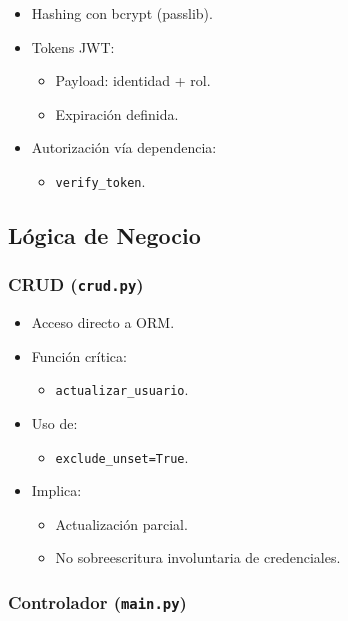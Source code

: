 \documentclass[12pt,letterpaper]{article}
\begin{document}
\begin{itemize}
    \item Hashing con bcrypt (passlib).
    \item Tokens JWT:
    \begin{itemize}
        \item Payload: identidad + rol.
        \item Expiración definida.
    \end{itemize}
    \item Autorización vía dependencia:
    \begin{itemize}
        \item \texttt{verify\_token}.
    \end{itemize}
\end{itemize}

\subsection{Lógica de Negocio}

\subsubsection{CRUD (\texttt{crud.py})}

\begin{itemize}
    \item Acceso directo a ORM.
    \item Función crítica:
    \begin{itemize}
        \item \texttt{actualizar\_usuario}.
    \end{itemize}
    \item Uso de:
    \begin{itemize}
        \item \texttt{exclude\_unset=True}.
    \end{itemize}
    \item Implica:
    \begin{itemize}
        \item Actualización parcial.
        \item No sobreescritura involuntaria de credenciales.
    \end{itemize}
\end{itemize}

\subsubsection{Controlador (\texttt{main.py})}
\end{document}
